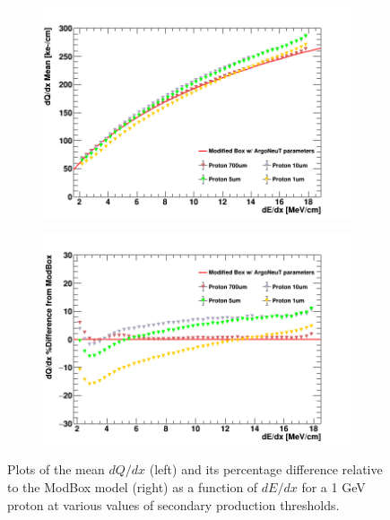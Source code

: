 \begin{figure}[bp!]
        \begin{subfigure}[b]{0.495\textwidth}   
            \centering 
            \includegraphics[width=\textwidth]{proton_profile}
            \caption{}%
            \label{fig:proton_range_delta_magnitude}
        \end{subfigure}
        \hfill
        \begin{subfigure}[b]{0.495\textwidth}   
            \centering 
            \includegraphics[width=\textwidth]{proton_profile_diff}
            \caption{}%
            \label{fig:proton_range_delta_diff}
        \end{subfigure}
        \caption{Plots of the mean $dQ/dx$ (left) and its percentage difference relative to the ModBox model (right) as a function of $dE/dx$ for a 1 GeV proton at various values of secondary production thresholds. }
        \label{fig:proton_range_delta}
\end{figure}
